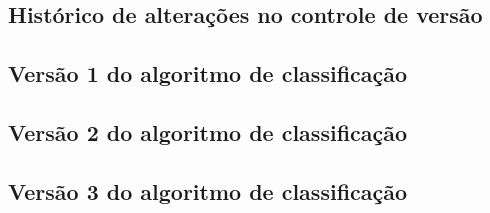\subsection{Histórico de alterações no controle de versão}
\label{historicoversoes}


\subsection{Versão 1 do algoritmo de classificação}
\label{versao1}

\subsection{Versão 2 do algoritmo de classificação}
\label{versao1}

\subsection{Versão 3 do algoritmo de classificação}
\label{versao1}